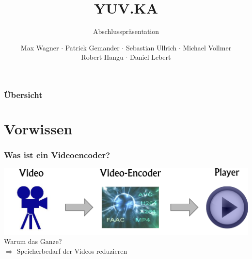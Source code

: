\documentclass[t]{beamer}
\title{YUV.KA}
\subtitle{Abschlusspräsentation}
\author{Max Wagner $\cdot$ Patrick Gemander $\cdot$ Sebastian Ullrich $\cdot$ Michael Vollmer \\ Robert Hangu $\cdot$ Daniel Lebert}
\institute[ITEC]{Institut für Technische Informatik}
\begin{document}
\begin{frame}
	\maketitle
\end{frame}

\begin{frame}
	\frametitle{Übersicht}
	\tableofcontents
\end{frame}

\section{Vorwissen}
\begin{frame}
	\frametitle{Was ist ein Videoencoder?}
	\begin{center}
		\vspace*{\fill}
		\includegraphics[scale=.43]{video-encoding-process.png}
		\vspace*{\fill}
		\onslide<2-> Warum das Ganze? ~\\
		\onslide<3-> $ \Longrightarrow $ Speicherbedarf der Videos reduzieren
	\end{center}
\end{frame}
\end{document}
